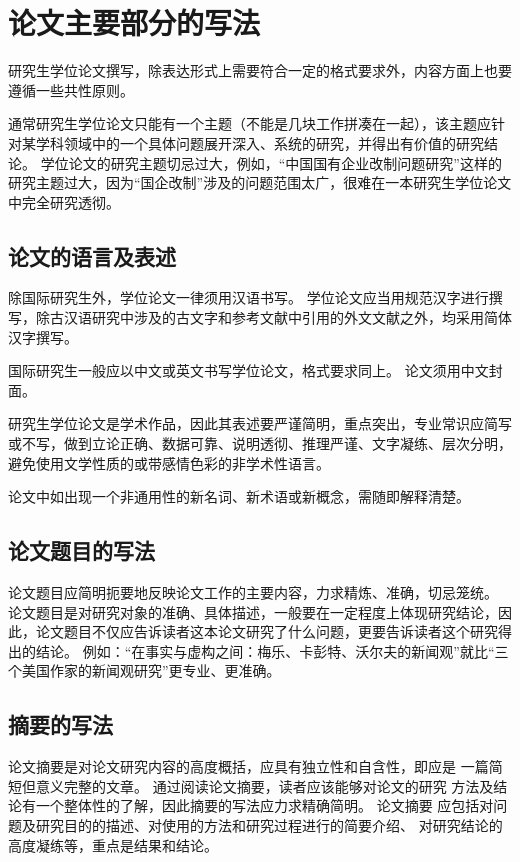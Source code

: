 \chapter{论文主要部分的写法}

研究生学位论文撰写，除表达形式上需要符合一定的格式要求外，内容方面上也要遵循一些共性原则。

通常研究生学位论文只能有一个主题（不能是几块工作拼凑在一起），该主题应针对某学科领域中的一个具体问题展开深入、系统的研究，并得出有价值的研究结论。
学位论文的研究主题切忌过大，例如，“中国国有企业改制问题研究”这样的研究主题过大，因为“国企改制”涉及的问题范围太广，很难在一本研究生学位论文中完全研究透彻。



\section{论文的语言及表述}

除国际研究生外，学位论文一律须用汉语书写。
学位论文应当用规范汉字进行撰写，除古汉语研究中涉及的古文字和参考文献中引用的外文文献之外，均采用简体汉字撰写。

国际研究生一般应以中文或英文书写学位论文，格式要求同上。
论文须用中文封面。

研究生学位论文是学术作品，因此其表述要严谨简明，重点突出，专业常识应简写或不写，做到立论正确、数据可靠、说明透彻、推理严谨、文字凝练、层次分明，避免使用文学性质的或带感情色彩的非学术性语言。

论文中如出现一个非通用性的新名词、新术语或新概念，需随即解释清楚。



\section{论文题目的写法}

论文题目应简明扼要地反映论文工作的主要内容，力求精炼、准确，切忌笼统。
论文题目是对研究对象的准确、具体描述，一般要在一定程度上体现研究结论，因此，论文题目不仅应告诉读者这本论文研究了什么问题，更要告诉读者这个研究得出的结论。
例如：“在事实与虚构之间：梅乐、卡彭特、沃尔夫的新闻观”就比“三个美国作家的新闻观研究”更专业、更准确。



\section{摘要的写法}

论文摘要是对论文研究内容的高度概括，应具有独立性和自含性，即应是 一篇简短但意义完整的文章。
通过阅读论文摘要，读者应该能够对论文的研究 方法及结论有一个整体性的了解，因此摘要的写法应力求精确简明。
论文摘要 应包括对问题及研究目的的描述、对使用的方法和研究过程进行的简要介绍、 对研究结论的高度凝练等，重点是结果和结论。

